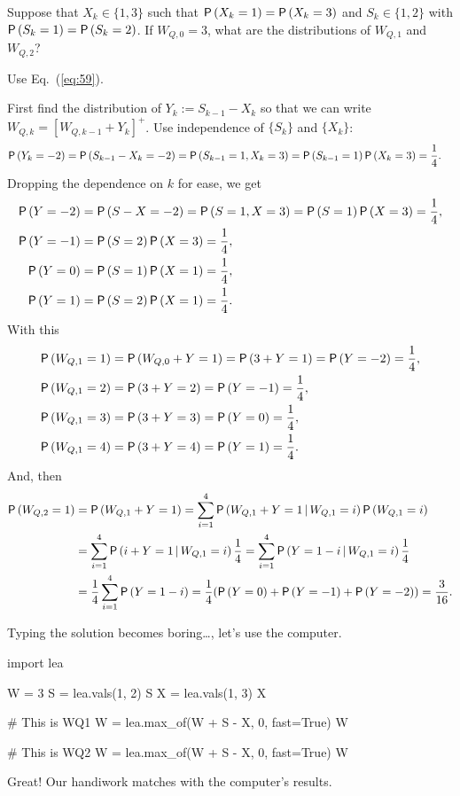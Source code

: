\begin{exercise}
  Suppose that $X_k\in\{1,3\}$ such that $\P{X_k=1}=\P{X_k=3}$ and
  $S_k\in\{1,2\}$ with $\P{S_k=1}=\P{S_k=2}$. If $W_{Q,0}=3$, what are
  the distributions of $W_{Q,1}$ and $W_{Q,2}$?  
  \begin{hint}
Use Eq.~(\ref{eq:59}).
\end{hint}
\begin{solution}  First find the distribution of $Y_k:=S_{k-1}-X_k$ so that we can write
  $W_{Q,k}=[W_{Q,k-1}+Y_k]^+$.  Use independence of $\{S_k\}$ and $\{X_k\}$:
\begin{align*}
  \P{Y_k=-2} &=\P{S_{k-1}-X_k=-2} = \P{S_{k-1}=1, X_k=3} = \P{S_{k-1}=1}\P{X_k=3} = \frac14.
\end{align*}
Dropping the dependence on $k$ for ease, we get
\begin{align*}
  \P{Y=-2} &=\P{S-X=-2} = \P{S=1, X=3} = \P{S=1}\P{X=3} = \frac14,\\
  \P{Y=-1} &=\P{S=2}\P{X=3} = \frac14,\\
  \P{Y=0} &=\P{S=1}\P{X=1} = \frac14,\\
  \P{Y=1} &=\P{S=2}\P{X=1} = \frac14.
\end{align*}
With this
  \begin{align*}
    \P{W_{Q,1} = 1} &=\P{W_{Q,0} + Y= 1} = \P{3 + Y =1} = \P{Y=-2} =\frac14,\\
    \P{W_{Q,1} = 2} &= \P{3 + Y =2} = \P{Y=-1}  =\frac14,\\
    \P{W_{Q,1} = 3} &= \P{3 + Y = 3} = \P{Y=0}  =\frac14,\\
    \P{W_{Q,1} = 4} &= \P{3 + Y = 4} = \P{Y=1}  =\frac14.\\
  \end{align*}
And, then
  \begin{equation*}
    \begin{split}
    \P{W_{Q,2} = 1} 
&=\P{W_{Q,1} + Y = 1} = \sum_{i=1}^4 \P{W_{Q,1} + Y = 1\given W_{Q,1}=i}\P{W_{Q,1}=i}\\
&=\sum_{i=1}^4 \P{i + Y = 1\given W_{Q,1}=i}\frac14
=\sum_{i=1}^4 \P{Y = 1-i\given W_{Q,1}=i}\frac14\\
&=\frac14\sum_{i=1}^4 \P{Y = 1-i} = \frac14(\P{Y = 0} + \P{Y=-1} +\P{Y=-2}) = \frac{3}{16}.
    \end{split}
  \end{equation*}

Typing the solution becomes  boring\ldots, let's use the computer.

\begin{pyconsole}
import lea

W = 3
S = lea.vals(1,  2)
S
X = lea.vals(1,  3)
X

# This is WQ1
W = lea.max_of(W + S - X, 0, fast=True)
W

# This is WQ2
W = lea.max_of(W + S - X, 0, fast=True)
W
\end{pyconsole}
Great! Our handiwork matches with the computer's results. 

\end{solution}
\end{exercise}


